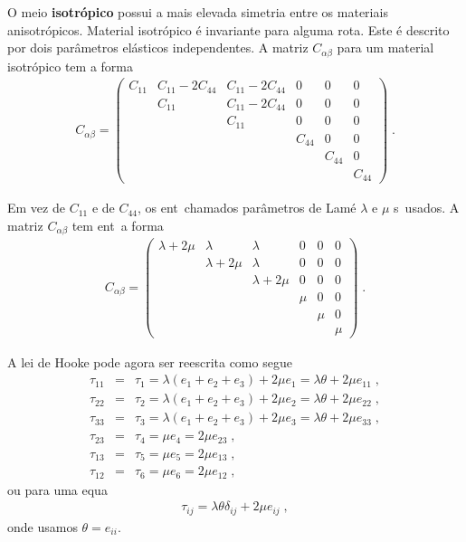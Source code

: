 O meio {\bf isotr\'opico} possui a mais elevada simetria entre
os materiais anisotr\'opicos. Material isotr\'opico \'e
invariante para alguma rota\cao. Este \'e descrito por
dois par\^ametros el\'asticos independentes. A matriz
$C_{\alpha \beta}$ para um material isotr\'opico tem a
forma
\begin{eqnarray}
C_{\alpha \beta} = \left(
\begin{array}{cccccc}
C_{11} & C_{11}-2C_{44} & C_{11}-2C_{44} & 0 & 0 & 0 \\
       & C_{11} & C_{11}-2C_{44} & 0 & 0 & 0 \\
       &        & C_{11} & 0 & 0 & 0 \\
       &        &        & C_{44} & 0      & 0 \\
       &        &        &        & C_{44} & 0 \\
       &        &        &  &  & C_{44}
\end{array} \right) \; .
\end{eqnarray}

Em vez de $C_{11}$ e de $C_{44}$, os ent\ao\ chamados
par\^ametros de Lam\'e $\lambda$ e $\mu$ s\ao\ usados.
A matriz $C_{\alpha \beta}$ tem ent\ao\ a forma
\begin{eqnarray}
C_{\alpha \beta} = \left(
\begin{array}{cccccc}
\lambda+2\mu & \lambda  & \lambda & 0 & 0 & 0 \\
     & \lambda+2\mu & \lambda & 0  & 0 & 0 \\
     &       & \lambda+2\mu & 0 & 0 & 0 \\
     &       &        & \mu & 0 & 0 \\
     &       &        &     & \mu & 0 \\
     &       &        &     &     & \mu
\end{array} \right) \; .
\end{eqnarray}

A lei de Hooke pode agora ser reescrita como segue
\begin{eqnarray*}
\tau_{11} &=& \tau_1 = \lambda(e_1 + e_2 + e_3)+2\mu e_1=
\lambda \theta + 2 \mu e_{11} \; , \\
\tau_{22} &=& \tau_2 = \lambda(e_1 + e_2 + e_3)+2\mu e_2=
\lambda \theta + 2 \mu e_{22} \; , \\
\tau_{33} &=& \tau_3 = \lambda(e_1 + e_2 + e_3)+2\mu e_3=
\lambda \theta + 2 \mu e_{33} \; , \\
\tau_{23} &=& \tau_4 = \mu e_4 = 2 \mu e_{23} \; , \\
\tau_{13} &=& \tau_5 = \mu e_5 = 2 \mu e_{13} \; , \\
\tau_{12} &=& \tau_6 = \mu e_6 = 2 \mu e_{12} \; ,
\end{eqnarray*}
ou para uma equa\cao
\begin{eqnarray}
\tau_{ij} = \lambda \theta \delta_{ij} + 2 \mu e_{ij} \; ,
\end{eqnarray}
onde usamos $\theta = e_{ii}$.

